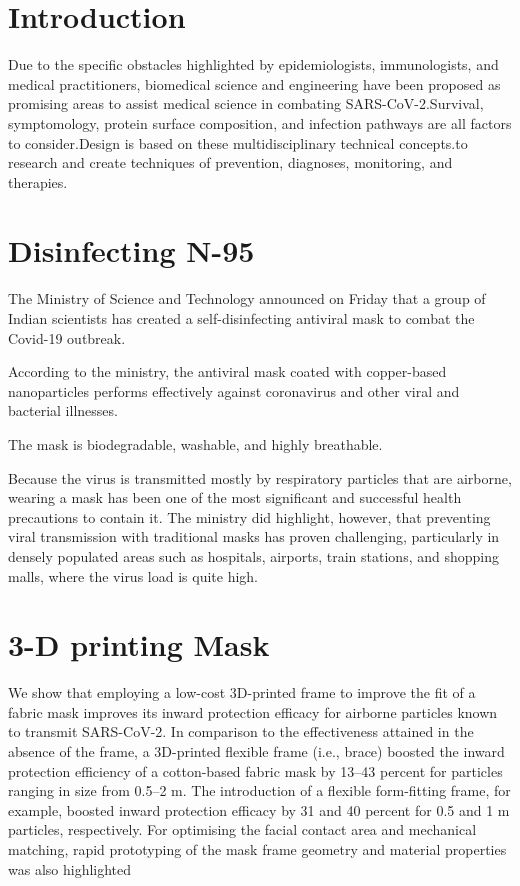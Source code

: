 \documentclass[12pt]{article}
\begin{document}
\section*{Introduction}

Due to the specific obstacles highlighted by epidemiologists, immunologists, and medical practitioners, biomedical science and engineering have been proposed as promising areas to assist medical science in combating SARS-CoV-2.Survival, symptomology, protein surface composition, and infection pathways are all factors to consider.Design is based on these multidisciplinary technical concepts.to research and create techniques of prevention, diagnoses, monitoring, and therapies.

\section{Disinfecting N-95}

The Ministry of Science and Technology announced on Friday that a group of Indian scientists has created a self-disinfecting antiviral mask to combat the Covid-19 outbreak.

According to the ministry, the antiviral mask coated with copper-based nanoparticles performs effectively against coronavirus and other viral and bacterial illnesses.

The mask is biodegradable, washable, and highly breathable.

Because the virus is transmitted mostly by respiratory particles that are airborne, wearing a mask has been one of the most significant and successful health precautions to contain it. The ministry did highlight, however, that preventing viral transmission with traditional masks has proven challenging, particularly in densely populated areas such as hospitals, airports, train stations, and shopping malls, where the virus load is quite high.

\section{3-D printing Mask}

We show that employing a low-cost 3D-printed frame to improve the fit of a fabric mask improves its inward protection efficacy for airborne particles known to transmit SARS-CoV-2. In comparison to the effectiveness attained in the absence of the frame, a 3D-printed flexible frame (i.e., brace) boosted the inward protection efficiency of a cotton-based fabric mask by 13–43 percent for particles ranging in size from 0.5–2 m. The introduction of a flexible form-fitting frame, for example, boosted inward protection efficacy by 31 and 40 percent for 0.5 and 1 m particles, respectively. For optimising the facial contact area and mechanical matching, rapid prototyping of the mask frame geometry and material properties was also highlighted
\end{document}
